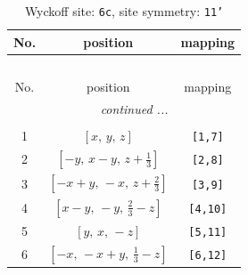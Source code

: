 \documentclass[fleqn,8pt]{jsarticle}
\begin{document}
\renewcommand{\arraystretch}{1.2}
\begin{longtable}{ccc}
\caption{Wyckoff site: {\tt 6c}, site symmetry: {\tt 11'}}
 \\
 \hline \hline
No. & position & mapping \\ \hline \endfirsthead

\multicolumn{2}{l}{\tablename\ \thetable{}} \\
 \hline \hline
No. & position & mapping \\ \hline \endhead

 \hline \hline
\multicolumn{2}{r}{\footnotesize\it continued ...} \\ \endfoot

 \hline \hline
\multicolumn{2}{r}{} \\ \endlastfoot

1 & $\left[ x,\, y,\, z \right]$ & {\tt [1,7]} \\ \hline
2 & $\left[ - y,\, x - y,\, z + \frac{1}{3} \right]$ & {\tt [2,8]} \\ \hline
3 & $\left[ - x + y,\, - x,\, z + \frac{2}{3} \right]$ & {\tt [3,9]} \\ \hline
4 & $\left[ x - y,\, - y,\, \frac{2}{3} - z \right]$ & {\tt [4,10]} \\ \hline
5 & $\left[ y,\, x,\, - z \right]$ & {\tt [5,11]} \\ \hline
6 & $\left[ - x,\, - x + y,\, \frac{1}{3} - z \right]$ & {\tt [6,12]} \\
\end{longtable}
\end{document}
